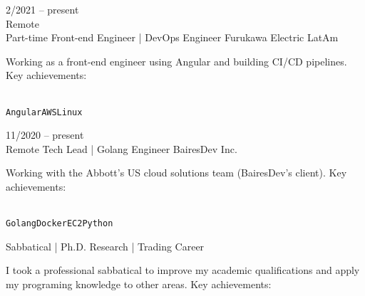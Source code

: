 \documentclass[9pt]{developercv} %
\begin{document}


\begin{entrylist}
  \entry
  {2/2021 -- present\\\footnotesize{Remote}\\\footnotesize{Part-time}}
  {Front-end Engineer | DevOps Engineer}
  {Furukawa Electric LatAm}
  {Working as a front-end engineer using Angular and building CI/CD pipelines. Key achievements:\\
    \begin{contributionlist}
    \end{contributionlist}\\
    \texttt{Angular}\slashsep\texttt{AWS}\slashsep\texttt{Linux}}
  \entry
  {11/2020 -- present\\\footnotesize{Remote}}
  {Tech Lead | Golang Engineer}
  {BairesDev Inc.}
  {Working with the Abbott's US cloud solutions team (BairesDev's client). Key achievements:\\
    \begin{contributionlist}
    \end{contributionlist}\\
    \texttt{Golang}\slashsep\texttt{Docker}\slashsep\texttt{EC2}\slashsep\texttt{Python}}
  {Sabbatical | Ph.D. Research | Trading Career}
  {}
  {
    I took a professional sabbatical to improve my academic qualifications and apply my programing knowledge to other areas. Key achievements:\\
    \begin{contributionlist}

\end{contributionlist}}
\end{entrylist}
\end{document}
